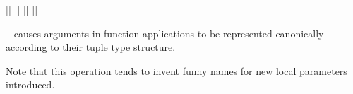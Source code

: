 \begin{isabellebody}
\begin{isamarkuptext}
  \begin{railoutput}
[]
\rail@bar
{}
[]
[]
[]
\rail@endbar
\rail@end
\end{railoutput}


  \begin{description}

  \item \hyperlink{attribute.HOL.split-format}{\mbox{}}\  causes
  arguments in function applications to be represented canonically
  according to their tuple type structure.

  Note that this operation tends to invent funny names for new local
  parameters introduced.


\end{description}
\end{isamarkuptext}
\end{isabellebody}
